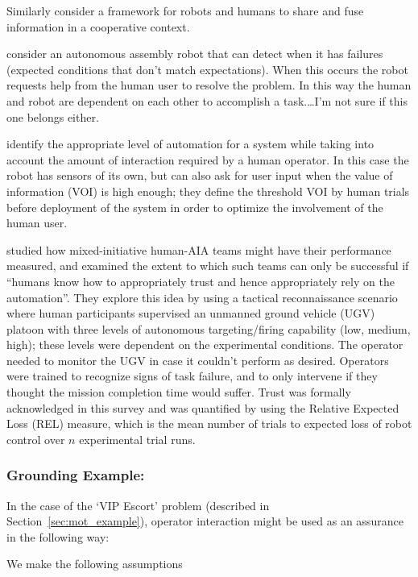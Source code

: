 Similarly \citet{Tse2015-tz} consider a framework for robots and humans to share and fuse information in a cooperative context. 

\citet{Tellex2014-uc} consider an autonomous assembly robot that can detect when it has failures (expected conditions that don't match expectations). When this occurs the robot requests help from the human user to resolve the problem. In this way the human and robot are dependent on each other to accomplish a task.\ldots I'm not sure if this one belongs either.

\citet{Kaupp2008-yr,Kaupp2005-pk} identify the appropriate level of automation for a system while taking into account the amount of interaction required by a human operator. In this case the robot has sensors of its own, but can also ask for user input when the value of information (VOI) is high enough; they define the threshold VOI by human trials before deployment of the system in order to optimize the involvement of the human user.

\citet{Freedy2007-sg} studied how mixed-initiative human-AIA teams might have their performance measured, and examined the extent to which such teams can only be successful if ``humans know how to appropriately trust and hence appropriately rely on the automation''. 
They explore this idea by using a tactical reconnaissance scenario where human participants supervised an unmanned ground vehicle (UGV)  platoon with three levels of autonomous targeting/firing capability (low, medium, high); these levels were dependent on the experimental conditions. The operator needed to monitor the UGV in case it couldn't perform as desired.
Operators were trained to recognize signs of task failure, and to only intervene if they thought the mission completion time would suffer. Trust was formally acknowledged in this survey and was quantified by using the Relative Expected Loss (REL) measure, which is the mean number of trials to expected loss of robot control over $n$ experimental trial runs. 

\subsubsection{Grounding Example:}
In the case of the `VIP Escort' problem (described in Section~\ref{sec:mot_example}), operator interaction might be used as an assurance in the following way:

We make the following assumptions

